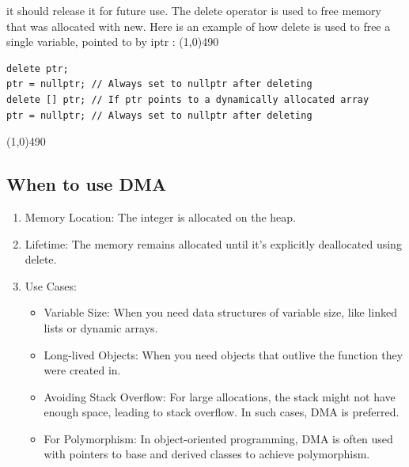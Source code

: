 \documentclass{report}
\begin{document}
    \bigbreak \noindent 
     it should
release it for future use. The delete operator is used to free memory that was allocated
with new. Here is an example of how delete is used to free a single variable, pointed to
by iptr :
    \bigbreak \noindent 
    \line(1,0){490}
    \begin{verbatim}
delete ptr;
ptr = nullptr; // Always set to nullptr after deleting
delete [] ptr; // If ptr points to a dynamically allocated array
ptr = nullptr; // Always set to nullptr after deleting
    \end{verbatim}
    \line(1,0){490}
    \bigbreak \noindent 
    \bigbreak \noindent 

    \bigbreak \noindent 
    \subsection{When to use DMA}
    \bigbreak \noindent 
    \begin{enumerate}
        \item Memory Location: The integer is allocated on the heap.
        \item Lifetime: The memory remains allocated until it's explicitly deallocated using delete.
        \item Use Cases:
        \begin{itemize}
            \item Variable Size: When you need data structures of variable size, like linked lists or dynamic arrays.
            \item Long-lived Objects: When you need objects that outlive the function they were created in.
            \item Avoiding Stack Overflow: For large allocations, the stack might not have enough space, leading to stack overflow. In such cases, DMA is preferred.
            \item For Polymorphism: In object-oriented programming, DMA is often used with pointers to base and derived classes to achieve polymorphism.
        \end{itemize}
    \end{enumerate}

    \bigbreak \noindent 
\end{document}
